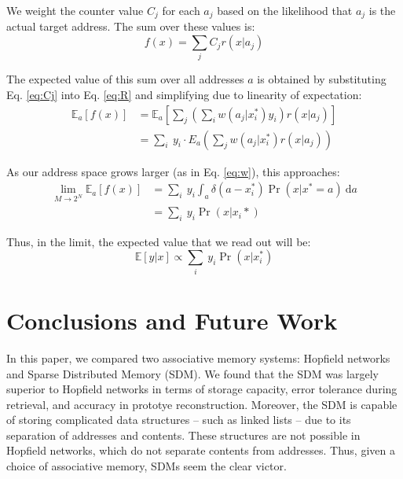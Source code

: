\documentclass[10pt,letterpaper]{article}
\begin{document}
\noindent We weight the counter value $C_j$ for each $a_j$ based on the
likelihood that $a_j$ is the actual target address. The sum over these
values is:
\begin{equation}
f(x)=\sum_j C_j r(x| a_j)
\label{eq:R}
\end{equation}


\noindent The expected value of this sum over all addresses $a$ is obtained by
substituting Eq. \ref{eq:Cj} into Eq. \ref{eq:R} and simplifying due
to linearity of expectation:
\begin{align}
\mathbb{E}_a[f(x)]&=\mathbb{E}_a\left[\sum_j\left(\sum_i w(a_j| x_i^*)y_i\right)r(x|a_j)\right]\\
&=\sum_i\ y_i\cdot E_a\left(\sum_j w(a_j| x_i^*)r(x|a_j)\right)
\end{align}

\noindent As our address space grows larger (as in Eq. \ref{eq:w}), this approaches:
\begin{align}
\lim_{M\rightarrow 2^N} \mathbb{E}_a[f(x)]&=\sum_i\ y_i \int_a \delta(a-x_i^*)\Pr(x|x^*=a)\ \mathrm{d}a\\
&= \sum_i\ y_i\Pr(x|x_i*)
\end{align}

\noindent Thus, in the limit, the expected value that we read out will be:
\begin{equation}
\mathbb{E}[y|x]\propto \sum_i\ y_i\Pr(x|x_i^*)
\end{equation}



\section{Conclusions and Future Work}

In this paper, we compared two associative memory systems: Hopfield
networks and Sparse Distributed Memory (SDM). We found that the SDM
was largely superior to Hopfield networks in terms of storage
capacity, error tolerance during retrieval, and accuracy in prototye
reconstruction. Moreover, the SDM is capable of storing complicated
data structures -- such as linked lists -- due to its separation of
addresses and contents.  These structures are not possible in Hopfield
networks, which do not separate contents from addresses. Thus, given a
choice of associative memory, SDMs seem the clear victor.
\end{document}
